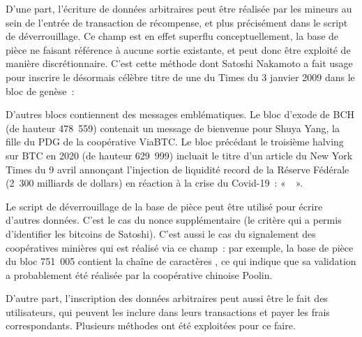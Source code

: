 D'une part, l'écriture de données arbitraires peut être réalisée par les mineurs au sein de l'entrée de transaction de récompense, et plus précisément dans le script de déverrouillage. Ce champ est en effet superflu conceptuellement, la base de pièce ne faisant référence à aucune sortie existante, et peut donc être exploité de manière discrétionnaire. C'est cette méthode dont Satoshi Nakamoto a fait usage pour inscrire le désormais célèbre titre de une du Times du 3 janvier 2009 dans le bloc de genèse~:

\begin{quote}
\end{quote}

D'autres blocs contiennent des messages emblématiques. Le bloc d'exode de BCH (de hauteur 478~559) contenait un message de bienvenue pour Shuya Yang, la fille du PDG de la coopérative ViaBTC. Le bloc précédant le troisième halving sur BTC en 2020 (de hauteur 629~999) incluait le titre d'un article du New York Times du 9 avril annonçant l'injection de liquidité record de la Réserve Fédérale (2~300 milliards de dollars) en réaction à la crise du Covid-19~: «~~».

Le script de déverrouillage de la base de pièce peut être utilisé pour écrire d'autres données. C'est le cas du nonce supplémentaire (le critère qui a permis d'identifier les bitcoins de Satoshi). C'est aussi le cas du signalement des coopératives minières qui est réalisé via ce champ~: par exemple, la base de pièce du bloc 751~005 contient la chaîne de caractères , ce qui indique que sa validation a probablement été réalisée par la coopérative chinoise Poolin.

D'autre part, l'inscription des données arbitraires peut aussi être le fait des utilisateurs, qui peuvent les inclure dans leurs transactions et payer les frais correspondants. Plusieurs méthodes ont été exploitées pour ce faire.

